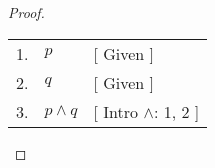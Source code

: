 \begin{proof} \hfill\par
    \begin{tabular}{rll}
        1. & \( p \) & [ Given ] \\
        2. & \( q \) & [ Given ] \\
        3. & \( p \land q \) & [ Intro \(\land\): 1, 2 ] \\
    \end{tabular} \par
\end{proof}
